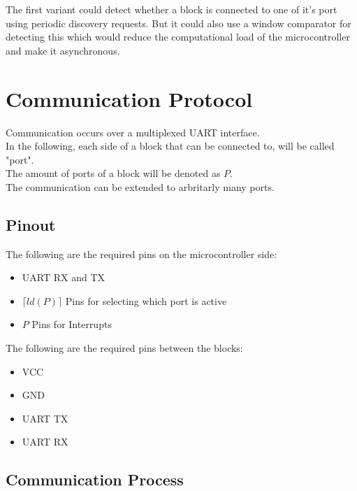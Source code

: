 The first variant could detect whether a block is connected to one of it's port using periodic discovery requests.
But it could also use a window comparator for detecting this which would reduce the computational load of the microcontroller and make it asynchronous. 

\section{Communication Protocol}

Communication occurs over a multiplexed UART interface.\\
In the following, each side of a block that can be connected to, will be called "port".\\
The amount of ports of a block will be denoted as $P$.\\
The communication can be extended to arbritarly many ports.

\subsection{Pinout}

The following are the required pins on the microcontroller side:
\begin{itemize}
    \item UART RX and TX
    \item $\lceil ld(P)\rceil$ Pins for selecting which port is active
    \item $P$ Pins for Interrupts
\end{itemize}

The following are the required pins between the blocks:
\begin{itemize}
    \item VCC
    \item GND
    \item UART TX
    \item UART RX
\end{itemize}

\subsection{Communication Process}

